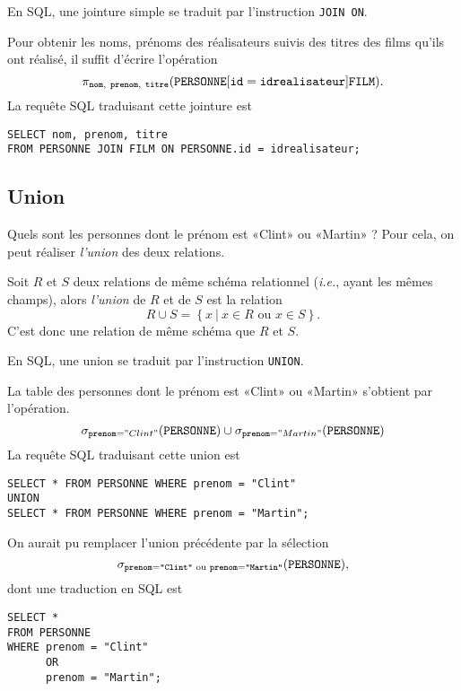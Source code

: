 En SQL, une jointure simple se traduit par l'instruction \texttt{JOIN ON}.
\begin{exemple}
Pour obtenir les noms, prénoms des réalisateurs suivis des titres des films qu'ils ont réalisé, il suffit d'écrire l'opération
\begin{equation*}
  \pi_{\ttnom,\ \ttprenom,\ \tttitre}(\PERSONNE[\ttid = \ttidr] \FILM).
\end{equation*}
La requête SQL traduisant cette jointure est 
\begin{verbatim}
SELECT nom, prenom, titre
FROM PERSONNE JOIN FILM ON PERSONNE.id = idrealisateur;
\end{verbatim}

\end{exemple}

\subsection{Union}
Quels sont les personnes dont le prénom est «Clint» ou «Martin» ? Pour cela, on peut réaliser  \emph{l'union} des deux relations.

\begin{defi}[Union]
  Soit $R$ et $S$ deux relations de même schéma relationnel (\emph{i.e.}, ayant les mêmes champs), alors \emph{l'union} de $R$ et de $S$ est la relation 
  \begin{equation*}
    R\cup S = \left\{x ~|~ x\in R\textrm{ ou }x\in S\right\}.
  \end{equation*}
  C'est donc une relation de même schéma que $R$ et $S$.
\end{defi}

En SQL, une union se traduit par l'instruction \texttt{UNION}.
\begin{exemple}
La table des personnes dont le prénom est «Clint» ou «Martin» s'obtient par l'opération.
\begin{equation*}
  \sigma_{\mathtt{prenom}="Clint"}(\mathtt{PERSONNE})\cup \sigma_{\mathtt{prenom}="Martin"}(\mathtt{PERSONNE})
\end{equation*}
La requête SQL traduisant cette union est 
\begin{verbatim}
SELECT * FROM PERSONNE WHERE prenom = "Clint"
UNION
SELECT * FROM PERSONNE WHERE prenom = "Martin";
\end{verbatim}
\end{exemple}
\begin{rem}
  On aurait pu remplacer l'union précédente par la sélection 
  \begin{equation*}
    \sigma_{\mathtt{prenom}=\texttt{"Clint"}\textrm{ ou }\mathtt{prenom}=\texttt{"Martin"}}(\mathtt{PERSONNE}),
  \end{equation*}
  dont une traduction en SQL est 
\begin{verbatim}
SELECT * 
FROM PERSONNE
WHERE prenom = "Clint"
      OR 
      prenom = "Martin";
\end{verbatim}
\end{rem}


